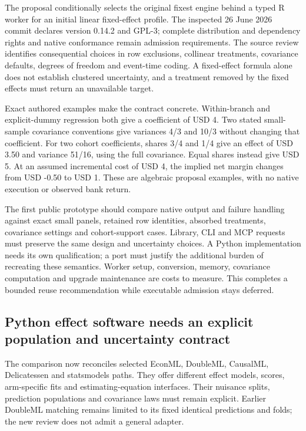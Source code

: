 The proposal conditionally selects the original fixest engine behind a
typed R worker for an initial linear fixed-effect profile. The inspected
26 June 2026 commit declares version 0.14.2 and GPL-3; complete
distribution and dependency rights and native conformance remain
admission requirements. The source review identifies consequential
choices in row exclusions, collinear treatments, covariance defaults,
degrees of freedom and event-time coding. A fixed-effect formula alone
does not establish clustered uncertainty, and a treatment removed by the
fixed effects must return an unavailable target.
\citep{exec20_fixest_source}

Exact authored examples make the contract concrete. Within-branch and
explicit-dummy regression both give a coefficient of USD 4. Two stated
small-sample covariance conventions give variances 4/3 and 10/3 without
changing that coefficient. For two cohort coefficients, shares 3/4 and
1/4 give an effect of USD 3.50 and variance 51/16, using the full
covariance. Equal shares instead give USD 5. At an assumed incremental
cost of USD 4, the implied net margin changes from USD -0.50 to USD 1.
These are algebraic proposal examples, with no native execution or
observed bank return. \citep{exec20_fixest_reference}

The first public prototype should compare native output and failure
handling against exact small panels, retained row identities, absorbed
treatments, covariance settings and cohort-support cases. Library, CLI
and MCP requests must preserve the same design and uncertainty choices.
A Python implementation needs its own qualification; a port must justify
the additional burden of recreating these semantics. Worker setup,
conversion, memory, covariance computation and upgrade maintenance are
costs to measure. This completes a bounded reuse recommendation while
executable admission stays deferred.

\hypertarget{python-effect-software-needs-an-explicit-population-and-uncertainty-contract}{%
\subsection{Python effect software needs an explicit population and
uncertainty
contract}\label{python-effect-software-needs-an-explicit-population-and-uncertainty-contract}}

The comparison now reconciles selected EconML, DoubleML, CausalML,
Delicatessen and statsmodels paths. They offer different effect models,
scores, arm-specific fits and estimating-equation interfaces. Their
nuisance splits, prediction populations and covariance laws must remain
explicit. Earlier DoubleML matching remains limited to its fixed
identical predictions and folds; the new review does not admit a general
adapter.
\citep{exec19_econml_source,runtime_doubleml_scope,exec14_causalml_primary,v13_sw_delicatessen,v131_sw_delicatessen}

